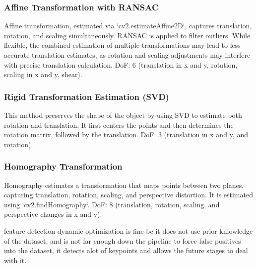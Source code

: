 \subsubsection*{Affine Transformation with RANSAC}
Affine transformation, estimated via `cv2.estimateAffine2D`, captures translation, rotation, and scaling simultaneously. RANSAC is applied to filter outliers. While flexible, the combined estimation of multiple transformations may lead to less accurate translation estimates, as rotation and scaling adjustments may interfere with precise translation calculation.  
DoF: 6 (translation in x and y, rotation, scaling in x and y, shear).

\subsubsection*{Rigid Transformation Estimation (SVD)}
This method preserves the shape of the object by using SVD to estimate both rotation and translation. It first centers the points and then determines the rotation matrix, followed by the translation.  
DoF: 3 (translation in x and y, and rotation). 

\subsubsection*{Homography Transformation}
Homography estimates a transformation that maps points between two planes, capturing translation, rotation, scaling, and perspective distortion. It is estimated using `cv2.findHomography`.  
DoF: 8 (translation, rotation, scaling, and perspective changes in x and y).








feature detection dynamic optimization is fine bc it does not use prior kniowledge of the dataset, and is not far enough down the pipeline to force false positives into the dataset, it detects alot of keypoints and allows the future stages to deal with it. 


